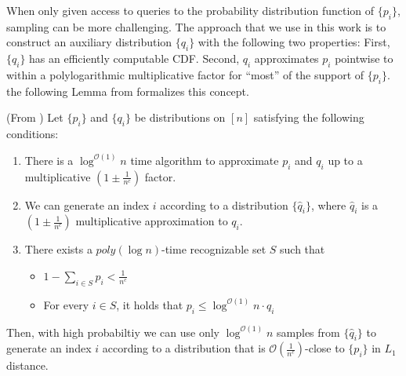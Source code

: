 When only given access to queries to the probability distribution function of $\{p_i\}$, sampling can be more challenging.
The approach that we use in this work is to construct an auxiliary distribution $\{q_i\}$ with the following two properties:
First, $\{ q_i\}$ has an efficiently computable CDF.
Second, $q_i$ approximates $p_i$ pointwise to within a polylogarithmic multiplicative factor for ``most'' of the support of $\{ p_i\}$.
the following Lemma from \cite{huge} formalizes this concept. %
\begin{lemma}
\label{lem:rejection_sampling} (From \cite{huge})
Let $\{p_i\}$ and $\{q_i\}$ be distributions on $[n]$ satisfying the following conditions:
\begin{enumerate}
    \item There is a $\log^{\mathcal O(1)}n$ time algorithm to approximate $p_i$ and $q_i$
    up to a multiplicative $\left(1\pm \frac{1}{n^c}\right)$ factor.
    \item We can generate an index $i$ according to a distribution $\{\hat q_i\}$,
    where $\hat q_i$ is a $\left(1\pm \frac{1}{n^c}\right)$ multiplicative approximation to $q_i$.
    \item There exists a $poly(\log n)$-time recognizable set $S$ such that
    \begin{itemize}
        \item $1-\sum\limits_{i\in S} p_i < \frac 1{n^c}$
        \item For every $i\in S$, it holds that $p_i\le \log^{\mathcal{O}(1)} n\cdot q_i$
    \end{itemize}
\end{enumerate}
Then, with high probabiltiy we can use only $\log^{\mathcal O(1)}n$ samples from $\{\hat q_i\}$ to generate an index $i$
according to a distribution that is $ \mathcal O\left(\frac{1}{n^c}\right)$-close to $\{p_i\}$ in $L_1$ distance.
\end{lemma}
